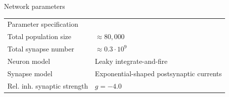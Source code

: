 \documentclass[xcolor=x11names,compress]{beamer}
\renewcommand{\(}{\begin{columns}}
\renewcommand{\)}{\end{columns}}
\newcommand{\<}[1]{\begin{column}{#1}}
\renewcommand{\>}{\end{column}}
\begin{document}
\begin{frame}[t]{Network parameters}
\begin{table}[htpb]
    \centering
    \label{tab:network_parameters}
    \begin{tabular}{l l}
        \rowcolor{LightCyan} Parameter specification & \\
        \cellcolor{LightCyan} Total population size & $\approx 80,000$\\
        \cellcolor{LightCyan} Total synapse number  & $\approx 0.3 \cdot 10^9$\\
        \cellcolor{LightCyan} Neuron model          & Leaky integrate-and-fire\\
        \cellcolor{LightCyan} Synapse model         & Exponential-shaped postsynaptic currents\\
        \cellcolor{LightCyan} Rel. inh. synaptic strength & $g = -4.0$\\
    \end{tabular}
\end{table}
\end{frame}
\end{document}
